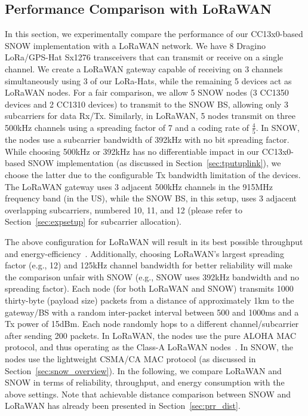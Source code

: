 \subsection{Performance Comparison with LoRaWAN}

In this section, we experimentally compare the performance of our CC13x0-based SNOW implementation with a LoRaWAN network. We have 8 Dragino LoRa/GPS-Hat Sx1276 transceivers that can transmit or receive on a single channel. We create a LoRaWAN gateway capable of receiving on 3 channels simultaneously using 3 of our LoRa-Hats, while the remaining 5 devices act as LoRaWAN nodes. For a fair comparison, we allow 5 SNOW nodes (3 CC1350 devices and 2 CC1310 devices) to transmit to the SNOW BS, allowing only 3 subcarriers for data Rx/Tx. Similarly, in LoRaWAN, 5 nodes transmit on three 500kHz channels using a spreading factor of 7 and a coding rate of $\frac{4}{5}$.
In SNOW, the nodes use a subcarrier bandwidth of 392kHz with no bit spreading factor. While choosing 500kHz or 392kHz has no differentiable impact in our CC13x0-based SNOW implementation (as discussed in Section~\ref{sec:tputuplink}), we choose the latter due to the configurable Tx bandwidth limitation of the devices. The LoRaWAN gateway uses 3 adjacent 500kHz channels in the 915MHz frequency band (in the US), while the SNOW BS, in this setup, uses 3 adjacent overlapping subcarriers, numbered 10, 11, and 12 (please refer to Section~\ref{sec:expsetup} for subcarrier allocation).

The above configuration for LoRaWAN will result in its best possible throughput and energy-efficiency~\cite{snow_ton}. Additionally,  choosing LoRaWAN's largest spreading factor (e.g., 12) and 125kHz channel bandwidth for better reliability will make the comparison unfair with SNOW (e.g., SNOW uses 392kHz bandwidth and no spreading factor).
Each node (for both LoRaWAN and SNOW) transmits 1000 thirty-byte (payload size) packets from a distance of approximately 1km to the gateway/BS with a random inter-packet interval between 500 and 1000ms and a Tx power of 15dBm. Each node randomly hops to a different channel/subcarrier after sending 200 packets. In LoRaWAN, the nodes use the pure ALOHA MAC protocol, and thus operating as the Class-A LoRaWAN nodes~\cite{ismail2018low}. In SNOW, the nodes use the lightweight CSMA/CA MAC protocol (as discussed in Section~\ref{sec:snow_overview}).
In the following, we compare LoRaWAN and SNOW in terms of reliability, throughput, and energy consumption with the above settings. Note that achievable distance comparison between SNOW and LoRaWAN has already been presented in Section~\ref{sec:prr_dist}.

